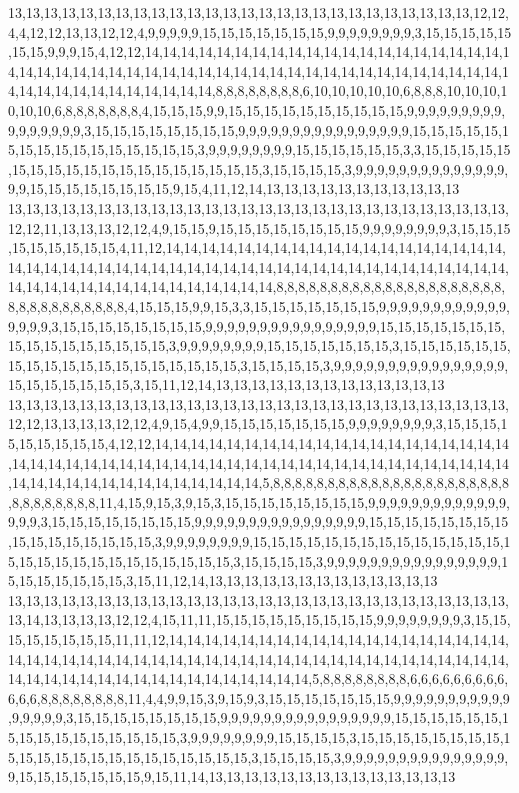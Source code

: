 13,13,13,13,13,13,13,13,13,13,13,13,13,13,13,13,13,13,13,13,13,13,13,13,13,13,12,12,4,4,12,12,13,13,12,12,4,9,9,9,9,9,15,15,15,15,15,15,15,9,9,9,9,9,9,9,9,3,15,15,15,15,15,15,15,9,9,9,15,4,12,12,14,14,14,14,14,14,14,14,14,14,14,14,14,14,14,14,14,14,14,14,14,14,14,14,14,14,14,14,14,14,14,14,14,14,14,14,14,14,14,14,14,14,14,14,14,14,14,14,14,14,14,14,14,14,14,14,14,14,14,14,8,8,8,8,8,8,8,8,6,10,10,10,10,10,6,8,8,8,10,10,10,10,10,10,6,8,8,8,8,8,8,8,4,15,15,15,9,9,15,15,15,15,15,15,15,15,15,15,9,9,9,9,9,9,9,9,9,9,9,9,9,9,9,9,3,15,15,15,15,15,15,15,15,9,9,9,9,9,9,9,9,9,9,9,9,9,9,9,9,15,15,15,15,15,15,15,15,15,15,15,15,15,15,15,15,3,9,9,9,9,9,9,9,9,15,15,15,15,15,15,3,3,15,15,15,15,15,15,15,15,15,15,15,15,15,15,15,15,15,15,15,3,15,15,15,15,3,9,9,9,9,9,9,9,9,9,9,9,9,9,9,9,9,15,15,15,15,15,15,15,15,9,15,4,11,12,14,13,13,13,13,13,13,13,13,13,13,13
13,13,13,13,13,13,13,13,13,13,13,13,13,13,13,13,13,13,13,13,13,13,13,13,13,13,13,13,12,12,11,13,13,13,12,12,4,9,15,15,9,15,15,15,15,15,15,15,15,9,9,9,9,9,9,9,9,3,15,15,15,15,15,15,15,15,15,4,11,12,14,14,14,14,14,14,14,14,14,14,14,14,14,14,14,14,14,14,14,14,14,14,14,14,14,14,14,14,14,14,14,14,14,14,14,14,14,14,14,14,14,14,14,14,14,14,14,14,14,14,14,14,14,14,14,14,14,14,14,14,14,14,8,8,8,8,8,8,8,8,8,8,8,8,8,8,8,8,8,8,8,8,8,8,8,8,8,8,8,8,8,8,8,8,4,15,15,15,9,9,15,3,3,15,15,15,15,15,15,15,9,9,9,9,9,9,9,9,9,9,9,9,9,9,9,9,3,15,15,15,15,15,15,15,15,9,9,9,9,9,9,9,9,9,9,9,9,9,9,9,9,15,15,15,15,15,15,15,15,15,15,15,15,15,15,15,15,3,9,9,9,9,9,9,9,9,15,15,15,15,15,15,15,3,15,15,15,15,15,15,15,15,15,15,15,15,15,15,15,15,15,15,15,3,15,15,15,15,3,9,9,9,9,9,9,9,9,9,9,9,9,9,9,9,9,15,15,15,15,15,15,15,3,15,11,12,14,13,13,13,13,13,13,13,13,13,13,13,13,13
13,13,13,13,13,13,13,13,13,13,13,13,13,13,13,13,13,13,13,13,13,13,13,13,13,13,13,13,12,12,13,13,13,13,12,12,4,9,15,4,9,9,15,15,15,15,15,15,15,9,9,9,9,9,9,9,9,3,15,15,15,15,15,15,15,15,15,4,12,12,14,14,14,14,14,14,14,14,14,14,14,14,14,14,14,14,14,14,14,14,14,14,14,14,14,14,14,14,14,14,14,14,14,14,14,14,14,14,14,14,14,14,14,14,14,14,14,14,14,14,14,14,14,14,14,14,14,14,14,14,14,14,5,8,8,8,8,8,8,8,8,8,8,8,8,8,8,8,8,8,8,8,8,8,8,8,8,8,8,8,8,8,8,11,4,15,9,15,3,9,15,3,15,15,15,15,15,15,15,15,9,9,9,9,9,9,9,9,9,9,9,9,9,9,9,9,3,15,15,15,15,15,15,15,15,9,9,9,9,9,9,9,9,9,9,9,9,9,9,9,9,15,15,15,15,15,15,15,15,15,15,15,15,15,15,15,15,3,9,9,9,9,9,9,9,9,15,15,15,15,15,15,15,15,15,15,15,15,15,15,15,15,15,15,15,15,15,15,15,15,15,15,15,3,15,15,15,15,3,9,9,9,9,9,9,9,9,9,9,9,9,9,9,9,9,15,15,15,15,15,15,15,3,15,11,12,14,13,13,13,13,13,13,13,13,13,13,13,13,13
13,13,13,13,13,13,13,13,13,13,13,13,13,13,13,13,13,13,13,13,13,13,13,13,13,13,13,13,13,14,13,13,13,13,12,12,4,15,11,11,15,15,15,15,15,15,15,15,15,9,9,9,9,9,9,9,9,3,15,15,15,15,15,15,15,15,11,11,12,14,14,14,14,14,14,14,14,14,14,14,14,14,14,14,14,14,14,14,14,14,14,14,14,14,14,14,14,14,14,14,14,14,14,14,14,14,14,14,14,14,14,14,14,14,14,14,14,14,14,14,14,14,14,14,14,14,14,14,14,14,14,14,14,5,8,8,8,8,8,8,8,8,6,6,6,6,6,6,6,6,6,6,6,6,8,8,8,8,8,8,8,8,11,4,4,9,9,15,3,9,15,9,3,15,15,15,15,15,15,15,9,9,9,9,9,9,9,9,9,9,9,9,9,9,9,9,3,15,15,15,15,15,15,15,15,9,9,9,9,9,9,9,9,9,9,9,9,9,9,9,9,15,15,15,15,15,15,15,15,15,15,15,15,15,15,15,15,3,9,9,9,9,9,9,9,9,15,15,15,15,3,15,15,15,15,15,15,15,15,15,15,15,15,15,15,15,15,15,15,15,15,15,15,3,15,15,15,15,3,9,9,9,9,9,9,9,9,9,9,9,9,9,9,9,9,15,15,15,15,15,15,15,9,15,11,14,13,13,13,13,13,13,13,13,13,13,13,13,13,13
